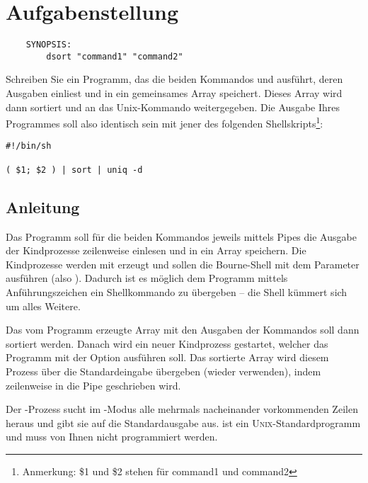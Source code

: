 




\section*{Aufgabenstellung}

\begin{verbatim}
    SYNOPSIS:
        dsort "command1" "command2"
\end{verbatim}

Schreiben Sie ein Programm, das die beiden Kommandos 
und  ausführt, deren Ausgaben einliest und in ein
gemeinsames Array speichert. Dieses Array wird dann sortiert und an
das Unix-Kommando  weitergegeben. Die Ausgabe Ihres
Programmes soll also identisch sein mit jener des folgenden
Shellskripts\footnote{Anmerkung: \$1 und \$2 stehen für command1 und
command2}:

\begin{verbatim}
#!/bin/sh

( $1; $2 ) | sort | uniq -d
\end{verbatim}

\subsection*{Anleitung}

Das Programm soll für die beiden Kommandos jeweils mittels Pipes die
Ausgabe der Kindprozesse zeilenweise einlesen und in ein Array
speichern. Die Kindprozesse werden mit  erzeugt und
sollen die Bourne-Shell mit dem Parameter  ausführen (also
). Dadurch ist es möglich dem Programm mittels
Anführungszeichen ein Shellkommando zu übergeben -- die Shell kümmert
sich um alles Weitere.

Das vom Programm erzeugte Array mit den Ausgaben der Kommandos soll
dann sortiert werden. Danach wird ein neuer Kindprozess gestartet,
welcher das Programm  mit der Option  ausführen
soll. Das sortierte Array wird diesem Prozess über die Standardeingabe
übergeben (wieder  verwenden), indem zeilenweise in die
Pipe geschrieben wird.

Der -Prozess sucht im -Modus alle mehrmals
nacheinander vorkommenden Zeilen heraus und gibt sie auf die
Standardausgabe aus.  ist ein
\textsc{Unix}-Standardprogramm und muss von Ihnen nicht programmiert
werden.

